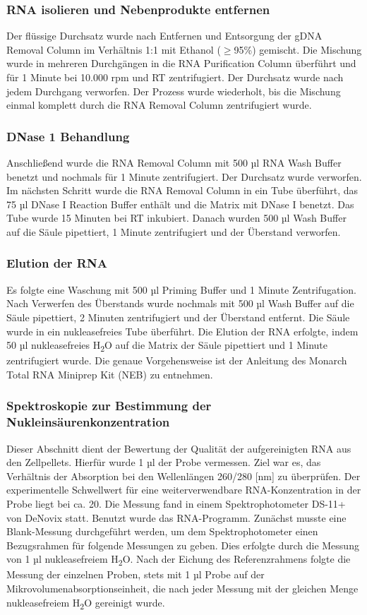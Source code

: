 \documentclass{article}
\begin{document}
\subsubsection*{RNA isolieren und Nebenprodukte entfernen}
Der flüssige Durchsatz wurde nach Entfernen und Entsorgung der
gDNA Removal Column im Verhältnis 1:1 mit Ethanol (\(\geq\)95\%) gemischt.
Die Mischung wurde in mehreren Durchgängen in
die RNA Purification Column überführt und für 1 Minute bei 10.000 rpm
und RT zentrifugiert. Der Durchsatz wurde nach jedem Durchgang verworfen.
Der Prozess wurde wiederholt, bis die Mischung einmal
komplett durch die RNA Removal Column zentrifugiert wurde.

\subsubsection*{DNase 1 Behandlung}
Anschließend wurde die RNA Removal Column mit 500 µl RNA Wash Buffer benetzt und nochmals für 1 Minute zentrifugiert. Der Durchsatz wurde verworfen. Im nächsten Schritt wurde die RNA Removal Column in ein Tube überführt, das 75 µl DNase I Reaction Buffer enthält und die Matrix mit DNase I benetzt. Das Tube wurde 15 Minuten bei RT inkubiert. Danach wurden 500 µl Wash Buffer auf die Säule pipettiert, 1 Minute zentrifugiert und der Überstand verworfen.

\subsubsection*{Elution der RNA}
Es folgte eine Waschung mit 500 µl Priming Buffer und 1 Minute Zentrifugation. Nach Verwerfen des Überstands wurde nochmals mit 500 µl Wash Buffer auf die Säule pipettiert, 2 Minuten zentrifugiert und der Überstand entfernt. Die Säule wurde in ein nukleasefreies Tube überführt. Die Elution der RNA erfolgte, indem 50 µl nukleasefreies H\textsubscript{2}O auf die Matrix der Säule pipettiert und 1 Minute zentrifugiert wurde. Die genaue Vorgehensweise ist der Anleitung des Monarch\textsuperscript{\textregistered} Total RNA Miniprep Kit (NEB) zu entnehmen.

\subsubsection*{Spektroskopie zur Bestimmung der Nukleinsäurenkonzentration}

Dieser Abschnitt dient der Bewertung der Qualität der aufgereinigten RNA aus den Zellpellets. Hierfür wurde 1 µl der Probe vermessen. Ziel war es, das Verhältnis der Absorption bei den Wellenlängen 260/280 [nm] zu überprüfen. Der experimentelle Schwellwert für eine weiterverwendbare RNA-Konzentration in der Probe liegt bei ca. 20. Die Messung fand in einem Spektrophotometer DS-11+ von DeNovix statt. Benutzt wurde das RNA-Programm. Zunächst musste eine Blank-Messung durchgeführt werden, um dem Spektrophotometer einen Bezugsrahmen für folgende Messungen zu geben. Dies erfolgte durch die Messung von 1 µl nukleasefreiem H\textsubscript{2}O. Nach der Eichung des Referenzrahmens folgte die Messung der einzelnen Proben, stets mit 1 µl Probe auf der Mikrovolumenabsorptionseinheit, die nach jeder Messung mit der gleichen Menge nukleasefreiem H\textsubscript{2}O gereinigt wurde.
\end{document}
